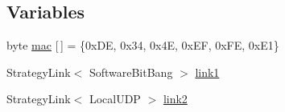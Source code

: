 \subsection*{Variables}
\begin{DoxyCompactItemize}
\item 
byte \hyperlink{BlinkingSwitch_8ino_aea3f7775fecafb66a619eb2dcb0357bd}{mac} \mbox{[}$\,$\mbox{]} = \{0x\-D\-E, 0x34, 0x4\-E, 0x\-E\-F, 0x\-F\-E, 0x\-E1\}
\item 
Strategy\-Link$<$ Software\-Bit\-Bang $>$ \hyperlink{BlinkingSwitch_8ino_a23282b44f676e7ce4d3df2e799b6a78c}{link1}
\item 
Strategy\-Link$<$ Local\-U\-D\-P $>$ \hyperlink{BlinkingSwitch_8ino_a3738aed90e382efb2532449d7e152c7b}{link2}
\end{DoxyCompactItemize}


